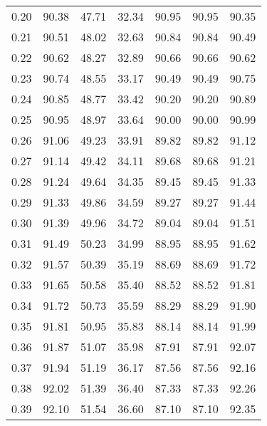 \begin{tabular}{|c|c|c|c|c|c|c|}
      0.20 &     90.38 &     47.71 &      32.34 &   90.95 &      90.95 &         90.35 \\
      0.21 &     90.51 &     48.02 &      32.63 &   90.84 &      90.84 &         90.49 \\
      0.22 &     90.62 &     48.27 &      32.89 &   90.66 &      90.66 &         90.62 \\
      0.23 &     90.74 &     48.55 &      33.17 &   90.49 &      90.49 &         90.75 \\
      0.24 &     90.85 &     48.77 &      33.42 &   90.20 &      90.20 &         90.89 \\
      0.25 &     90.95 &     48.97 &      33.64 &   90.00 &      90.00 &         90.99 \\
      0.26 &     91.06 &     49.23 &      33.91 &   89.82 &      89.82 &         91.12 \\
      0.27 &     91.14 &     49.42 &      34.11 &   89.68 &      89.68 &         91.21 \\
      0.28 &     91.24 &     49.64 &      34.35 &   89.45 &      89.45 &         91.33 \\
      0.29 &     91.33 &     49.86 &      34.59 &   89.27 &      89.27 &         91.44 \\
      0.30 &     91.39 &     49.96 &      34.72 &   89.04 &      89.04 &         91.51 \\
      0.31 &     91.49 &     50.23 &      34.99 &   88.95 &      88.95 &         91.62 \\
      0.32 &     91.57 &     50.39 &      35.19 &   88.69 &      88.69 &         91.72 \\
      0.33 &     91.65 &     50.58 &      35.40 &   88.52 &      88.52 &         91.81 \\
      0.34 &     91.72 &     50.73 &      35.59 &   88.29 &      88.29 &         91.90 \\
      0.35 &     91.81 &     50.95 &      35.83 &   88.14 &      88.14 &         91.99 \\
      0.36 &     91.87 &     51.07 &      35.98 &   87.91 &      87.91 &         92.07 \\
      0.37 &     91.94 &     51.19 &      36.17 &   87.56 &      87.56 &         92.16 \\
      0.38 &     92.02 &     51.39 &      36.40 &   87.33 &      87.33 &         92.26 \\
      0.39 &     92.10 &     51.54 &      36.60 &   87.10 &      87.10 &         92.35 \\

\end{tabular}
